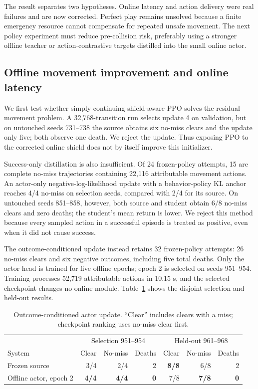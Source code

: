 \documentclass[10pt]{article}
\begin{document}
The result separates two hypotheses.  Online latency and action delivery were
real failures and are now corrected.  Perfect play remains unsolved because a
finite emergency resource cannot compensate for repeated unsafe movement.  The
next policy experiment must reduce pre-collision risk, preferably using a
stronger offline teacher or action-contrastive targets distilled into the small
online actor.

\subsection{Offline movement improvement and online latency}

We first test whether simply continuing shield-aware PPO solves the residual
movement problem.  A 32,768-transition run selects update 4 on validation, but
on untouched seeds 731--738 the source obtains six no-miss clears and the update
only five; both observe one death.  We reject the update.  Thus exposing PPO to
the corrected online shield does not by itself improve this initializer.

Success-only distillation is also insufficient.  Of 24 frozen-policy attempts,
15 are complete no-miss trajectories containing 22,116 attributable movement
actions.  An actor-only negative-log-likelihood update with a behavior-policy
KL anchor reaches 4/4 no-miss on selection seeds, compared with 2/4 for its
source.  On untouched seeds 851--858, however, both source and student obtain
6/8 no-miss clears and zero deaths; the student's mean return is lower.  We
reject this method because every sampled action in a successful episode is
treated as positive, even when it did not cause success.

The outcome-conditioned update instead retains 32 frozen-policy attempts: 26
no-miss clears and six negative outcomes, including five total deaths.  Only
the actor head is trained for five offline epochs; epoch 2 is selected on seeds
951--954.  Training processes 52,719 attributable actions in 10.15 s, and the
selected checkpoint changes no online module.  Table~\ref{tab:offline-outcome}
shows the disjoint selection and held-out results.

\begin{table}[ht]
  \centering
  \caption{Outcome-conditioned actor update.  ``Clear'' includes clears with a
  miss; checkpoint ranking uses no-miss clear first.}
  \label{tab:offline-outcome}
  \begin{tabular}{lrrrrrr}
    \toprule
    & \multicolumn{3}{c}{Selection 951--954} &
      \multicolumn{3}{c}{Held-out 961--968} \\
    System & Clear & No-miss & Deaths & Clear & No-miss & Deaths \\
    \midrule
    Frozen source & 3/4 & 2/4 & 2 & \textbf{8/8} & 6/8 & 2 \\
    Offline actor, epoch 2 & \textbf{4/4} & \textbf{4/4} & \textbf{0} &
      7/8 & \textbf{7/8} & \textbf{0} \\
    \bottomrule
  \end{tabular}
\end{table}
\end{document}
